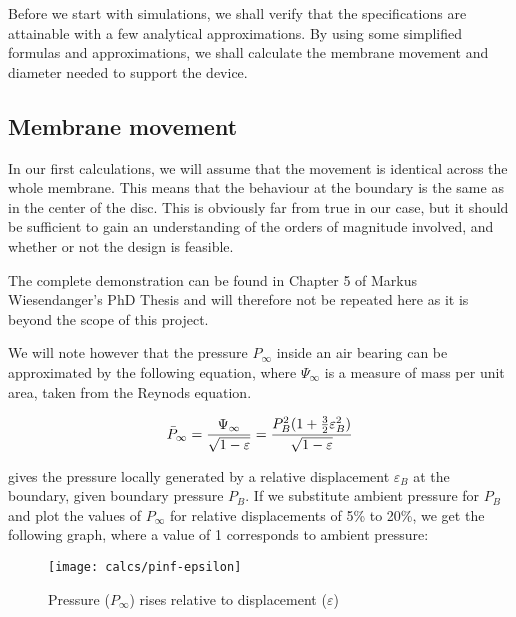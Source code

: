 Before we start with simulations, we shall verify that the specifications are
attainable with a few analytical approximations. By using some simplified
formulas and approximations, we shall calculate the membrane movement and
diameter needed to support the device.

\subsection{Membrane movement}
\label{sub:displacement}

In our first calculations, we will assume that the movement is identical across
the whole membrane. This means that the behaviour at the boundary is the same as
in the center of the disc. This is obviously far from true in our case, but it
should be sufficient to gain an understanding of the orders of magnitude
involved, and whether or not the design is feasible.

The complete demonstration can be found in Chapter 5 of Markus Wiesendanger's
PhD Thesis \cite{wiesendanger2001} and will therefore not be repeated here as it
is beyond the scope of this project.

We will note however that the pressure $P_\infty$ inside an air bearing can be approximated
by the following equation, where $\Psi_\infty$ is a measure of mass per unit
area, taken from the Reynods equation.

\begin{equation}
  \bar{P}_\infty = {{\Psi_\infty} \over {\sqrt{1 - \varepsilon}}} =
  {{P_B^2 (1 + \frac{3}{2} \varepsilon_B^2)} \over {\sqrt{1 - \varepsilon}}}
  \label{eq:pinf-epsilon}
\end{equation}

 gives the pressure locally generated by a relative
displacement $\varepsilon_B$ at the boundary, given boundary pressure $P_B$. If
we substitute ambient pressure for $P_B$ and plot the values of $P_\infty$ for
relative displacements of 5\% to 20\%, we get the following graph, where a value
of 1 corresponds to ambient pressure:

\begin{figure}[h]
  \begin{center}
    \texttt{[image: calcs/pinf-epsilon]}
  \end{center}
  \caption{Pressure ($P_\infty$) rises relative to displacement ($\varepsilon$)}
  \label{fig:pinf-epsilon}
\end{figure}

